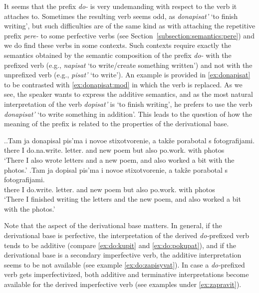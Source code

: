 It seems that the prefix \textit{do-} is very undemanding with respect to the verb it attaches to. Sometimes the resulting verb seems odd, as \textit{donapisat'} `to finish writing', but such difficulties are of the same kind as with attaching the repetitive prefix \textit{pere-} to some perfective verbs (see Section~\ref{subsection:semantics:pere}) and we do find these verbs in some contexts. Such contexts require exactly the semantics obtained by the semantic composition of the prefix \textit{do-} with the prefixed verb (e.g., \textit{napisat} `to write/create something written') and not with the unprefixed verb (e.g., \textit{pisat'} `to write'). An example is provided in \ref{ex:donapisat} to be contrasted with \ref{ex:donapisat:mod} in which the verb is replaced. As we see, the speaker wants to express the additive semantics, and as the most natural interpretation of the verb \textit{dopisat'} is `to finish writing', he prefers to use the verb \textit{donapisat'} `to write something in addition'. This leads to the question of how the meaning of the prefix is related to the properties of the derivational base.

\ex.\ag.\label{ex:donapisat}Tam ja donapisal pis'ma i novoe stixotvorenie, a tak\v{z}e porabotal s fotografijami.\\
there I do.na.write. letter. and new poem but also po.work. with photos\\
\trans `There I also wrote letters and a new poem, and also worked a bit with the photos.'
\bg.\label{ex:donapisat:mod}Tam ja dopisal pis'ma i novoe stixotvorenie, a tak\v{z}e porabotal s fotografijami.\\
there I do.write. letter. and new poem but also po.work. with photos\\
\trans `There I finished writing the letters and the new poem, and also worked a bit with the photos.'

Note that the aspect of the derivational base matters. In general, if the derivational base is perfective, the interpretation of the derived \textit{do-}prefixed verb tends to be additive (compare \ref{ex:do:kupit} and \ref{ex:do:pokupat}), and if the derivational base is a secondary imperfective verb, the additive interpretation seems to be not available (see example \ref{ex:do:zapisyvat}). In case a \textit{do-}prefixed verb gets imperfectivized, both additive and terminative interpretations become available for the derived imperfective verb (see examples under \ref{ex:zapravit}).


